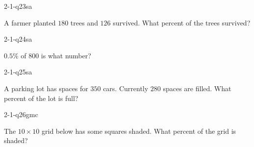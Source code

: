 \begin{practiceQuestion}{2-1-q23}{sa}
\begin{questionText}
A farmer planted $180$ trees and $126$ survived. What percent of the trees survived?
\end{questionText}
\end{practiceQuestion}

\begin{practiceQuestion}{2-1-q24}{sa}
\begin{questionText}
$0.5\%$ of $800$ is what number?
\end{questionText}
\end{practiceQuestion}

\begin{practiceQuestion}{2-1-q25}{sa}
\begin{questionText}
A parking lot has spaces for $350$ cars. Currently $280$ spaces are filled. What percent of the lot is full?
\end{questionText}
\end{practiceQuestion}


\begin{practiceQuestion}{2-1-q26}{gmc}
\begin{questionText}
The $10 \times 10$ grid below has some squares shaded. What percent of the grid is shaded?

\begin{center}
\end{center}
\end{questionText}
\end{practiceQuestion}


